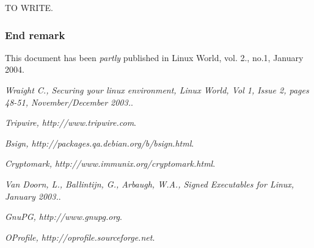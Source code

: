 \documentclass{article}
\begin{document}
TO WRITE.

\subsubsection*{End remark}

{\small This document has been {\it partly} published in Linux World, vol. 2., no.1, January 2004.}

\begin{thebibliography}{99}

  {\em Wraight C., Securing your linux environment, Linux World, Vol 1, 
    Issue 2, pages 48-51, November/December 2003.}.

  {\em Tripwire, http://www.tripwire.com}.

  {\em Bsign, http://packages.qa.debian.org/b/bsign.html}. 

  {\em Cryptomark, http://www.immunix.org/cryptomark.html}.

  {\em Van Doorn, L., Ballintijn, G., Arbaugh, W.A., Signed Executables for Linux, January 2003.}.

  {\em GnuPG, http://www.gnupg.org}. 

  {\em OProfile, http://oprofile.sourceforge.net}. 


\end{thebibliography}
\end{document}
